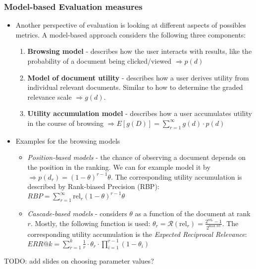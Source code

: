 \subsubsection{Model-based Evaluation measures}
\begin{itemize}
	\item Another perspective of evaluation is looking at different aspects of possibles metrics. A model-based approach considers the following three components:
	\begin{enumerate}
		\item \textbf{Browsing model} - describes how the user interacts with results, like the probability of a document being clicked/viewed $\Rightarrow p(d)$
		\item \textbf{Model of document utility} - describes how a user derives utility from individual relevant documents. Similar to how to determine the graded relevance scale $\Rightarrow g(d)$.
		\item \textbf{Utility accumulation model} - describes how a user accumulates utility in the course of browsing $\Rightarrow E\left[g(D)\right] = \sum_{r=1}^{\infty}g(d) \cdot p(d)$
	\end{enumerate}
	\item Examples for the browsing models
	\begin{itemize}
		\item \textit{Position-based models} - the chance of observing a document depends on the position in the ranking. We can for example model it by $\Rightarrow p(d_r)=(1-\theta)^{r-1} \theta$. The corresponding utility accumulation is described by Rank-biased Precision (RBP): $RBP = \sum_{r=1}^{\infty}\text{rel}_r (1-\theta)^{r-1} \theta$
		\item \textit{Cascade-based models} - considers $\theta$ as a function of the document at rank $r$. Mostly, the following function is used: $\theta_r = \mathcal{R}(\text{rel}_r) = \frac{2^{\text{rel}_r}-1}{2^{\text{max rel}}}$. The corresponding utility accumulation is the \textit{Expected Reciprocal Relevance}: $ERR@k = \sum\limits_{r=1}^{k} \frac{1}{r} \cdot \theta_r \cdot \prod\limits_{i=1}^{r-1}\left(1 - \theta_i\right)$
	\end{itemize}
\end{itemize}
TODO: add slides on choosing parameter values?
